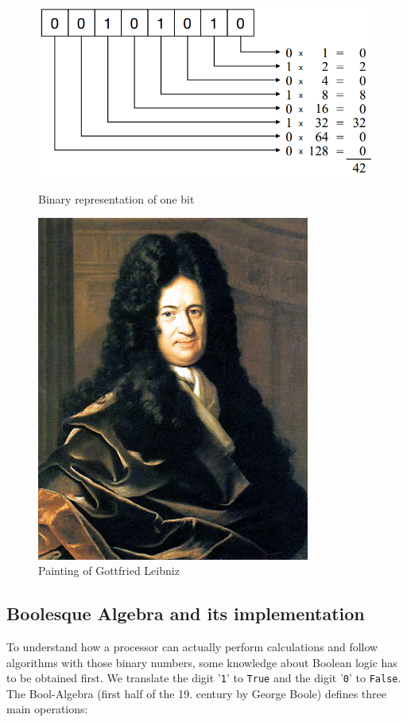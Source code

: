 \documentclass[10pt,a4paper]{article}
\begin{document}
\begin{figure}[H]
\centering
\begin{minipage}{0.5\textwidth}
  \includegraphics[width=1\textwidth]{binary.png}%
  \caption{Binary representation of one bit}%
  \label{fig:binary}
\end{minipage}%
\begin{minipage}{.4\textwidth}
  \centering
  \includegraphics[width=0.8\textwidth]{leibniz}%
  \caption{Painting of Gottfried Leibniz}%
  \label{fig:leibniz}
\end{minipage}
\end{figure}

\subsection{Boolesque Algebra and its implementation}
To understand how a processor can actually perform calculations and follow algorithms with those binary numbers, some knowledge about Boolean logic has to be obtained first. We translate the digit '\texttt{1}' to \texttt{True} and the digit '\texttt{0}' to \texttt{False}. The Bool-Algebra (first half of the 19. century by George Boole) defines three main operations: 
\end{document}
